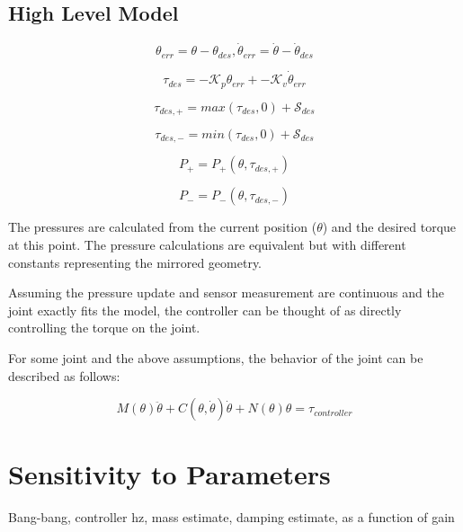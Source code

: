 \documentclass[12pt, letterpaper, oneside, notitlepage, onecolumn]{article}
\newcommand{\bbs}[1]{\section{#1}}
\newcommand{\bbss}[1]{\subsection{#1}}
\begin{document}
\bbss{High Level Model}

\begin{equation}
\theta_{err} = \theta - \theta_{des},
\dot{\theta}_{err} = \dot{\theta} - \dot{\theta}_{des}
\end{equation}

\begin{equation}
\tau_{des} = -\mathcal{K}_{p} \theta_{err} + -\mathcal{K}_{v} \dot{\theta}_{err}
\end{equation}

\begin{equation}
\tau_{des, +} = max(\tau_{des}, 0) + \mathcal{S}_{des}
\end{equation}

\begin{equation}
\tau_{des, -} = min(\tau_{des}, 0) + \mathcal{S}_{des}
\end{equation}

\begin{equation}
P_{+} = P_{+}(\theta, \tau_{des, +})
\end{equation}

\begin{equation}
P_{-} = P_{-}(\theta, \tau_{des, -})
\end{equation}

The pressures are calculated from the current position ($\theta$) and the
desired torque at this point. The pressure calculations are equivalent but with
different constants representing the mirrored geometry.

Assuming the pressure update and sensor measurement are continuous and the joint
exactly fits the model, the controller can be thought of as directly controlling
the torque on the joint. 

For some joint and the above assumptions, the behavior of the joint can be
described as follows:

\begin{equation}
M(\theta) \ddot{\theta} + C(\theta, \dot{\theta}) \dot{\theta} + N(\theta) \theta = 
\tau_{controller}
\end{equation}

\bbs{Sensitivity to Parameters}

Bang-bang, controller hz, mass estimate, damping estimate, as a function of gain
\end{document}
